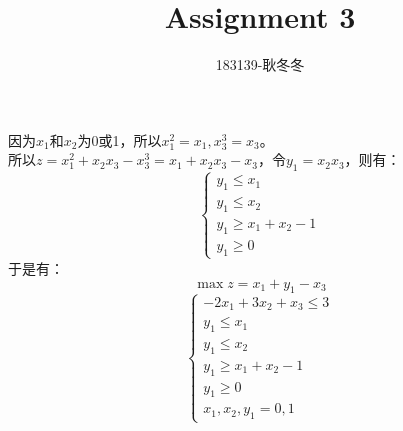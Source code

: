 \documentclass{article}
\begin{document}
\setlength{\leftskip}{20pt}
\title{Assignment 3}
\author{183139-耿冬冬}
\maketitle
\section{}
\noindent
因为$x_1$和$x_2$为0或1，所以$x_1^{2}=x_1,x_3^{3}=x_3$。\\
所以$z=x_1^{2}+x_2x_3-x_3^{3}=x_1+x_2x_3-x_3$，令$y_1=x_2x_3$，则有：\\
\begin{equation*}
    \left\{
        \begin{array}{l}
            y_1 \leq x_1 \\
            y_1 \leq x_2 \\
            y_1 \geq x_1+x_2-1 \\
            y_1 \geq 0
        \end{array}
        \right.
\end{equation*}
于是有：
\[\max z=x_1+y_1-x_3\]
\begin{equation*}
    \left\{
        \begin{array}{l}
            -2x_1+3x_2+x_3 \leq 3 \\
            y_1 \leq x_1 \\
            y_1 \leq x_2 \\
            y_1 \geq x_1+x_2-1 \\
            y_1 \geq 0 \\
            x_1,x_2,y_1=0,1
        \end{array}
        \right.
\end{equation*}
\end{document}
